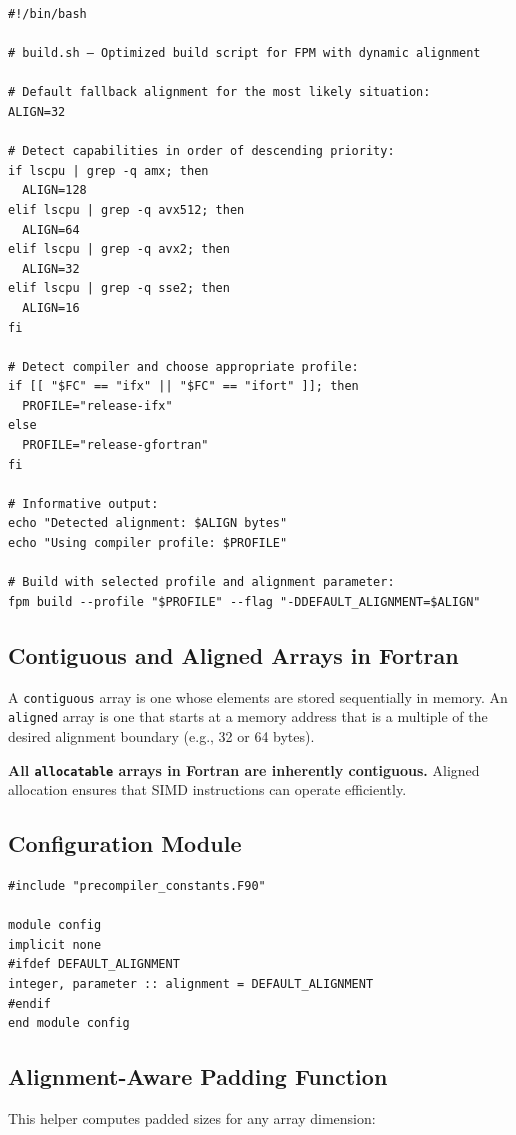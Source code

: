 \documentclass{article}
\begin{document}
\begin{verbatim}
#!/bin/bash

# build.sh — Optimized build script for FPM with dynamic alignment

# Default fallback alignment for the most likely situation:
ALIGN=32

# Detect capabilities in order of descending priority:
if lscpu | grep -q amx; then
  ALIGN=128
elif lscpu | grep -q avx512; then
  ALIGN=64
elif lscpu | grep -q avx2; then
  ALIGN=32
elif lscpu | grep -q sse2; then
  ALIGN=16
fi

# Detect compiler and choose appropriate profile:
if [[ "$FC" == "ifx" || "$FC" == "ifort" ]]; then
  PROFILE="release-ifx"
else
  PROFILE="release-gfortran"
fi

# Informative output:
echo "Detected alignment: $ALIGN bytes"
echo "Using compiler profile: $PROFILE"

# Build with selected profile and alignment parameter:
fpm build --profile "$PROFILE" --flag "-DDEFAULT_ALIGNMENT=$ALIGN"
\end{verbatim}

\subsection{Contiguous and Aligned Arrays in Fortran}
A \texttt{contiguous} array is one whose elements are stored sequentially in memory. An \texttt{aligned} array is one that starts at a memory address that is a multiple of the desired alignment boundary (e.g., 32 or 64 bytes).

\textbf{All \texttt{allocatable} arrays in Fortran are inherently contiguous.} Aligned allocation ensures that SIMD instructions can operate efficiently.

\subsection{Configuration Module}
\label{fortran_config_module}
\begin{verbatim}
#include "precompiler_constants.F90"

module config
implicit none
#ifdef DEFAULT_ALIGNMENT
integer, parameter :: alignment = DEFAULT_ALIGNMENT
#endif
end module config
\end{verbatim}

\subsection{Alignment-Aware Padding Function}
This helper computes padded sizes for any array dimension:
\end{document}

